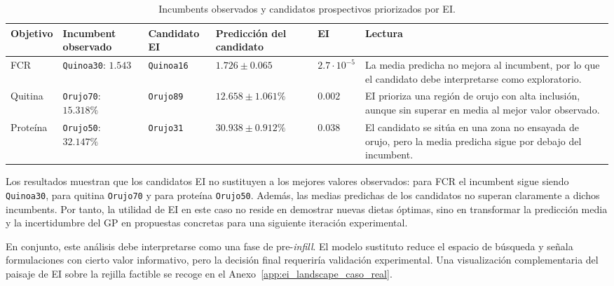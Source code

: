 \begin{table}[htbp]
    \centering
    \small
    \caption[Incumbents y candidatos por EI]{Incumbents observados y candidatos prospectivos priorizados por EI.}
    \label{tab:incumbents_candidatos_ei}
    \renewcommand{\arraystretch}{1.15}
    \setlength{\tabcolsep}{4pt}
    \begin{tabularx}{\textwidth}{@{}p{1.5cm} p{3cm} p{2.6cm} p{2.6cm} p{1.1cm} X@{}}
        \toprule
        \textbf{Objetivo} 
        & \textbf{Incumbent observado} 
        & \textbf{Candidato EI} 
        & \textbf{Predicción del candidato} 
        & \textbf{EI} 
        & \textbf{Lectura} \\
        \midrule

        FCR
        & \texttt{Quinoa30}: \(1.543\)
        & \texttt{Quinoa16}
        & \(1.726 \pm 0.065\)
        & \(2.7{\cdot}10^{-5}\)
        & La media predicha no mejora al incumbent, por lo que el candidato debe interpretarse como exploratorio. \\

        Quitina
        & \texttt{Orujo70}: \(15.318\%\)
        & \texttt{Orujo89}
        & \(12.658 \pm 1.061\%\)
        & \(0.002\)
        & EI prioriza una región de orujo con alta inclusión, aunque sin superar en media al mejor valor observado. \\

        Proteína
        & \texttt{Orujo50}: \(32.147\%\)
        & \texttt{Orujo31}
        & \(30.938 \pm 0.912\%\)
        & \(0.038\)
        & El candidato se sitúa en una zona no ensayada de orujo, pero la media predicha sigue por debajo del incumbent. \\

        \bottomrule
    \end{tabularx}
\end{table}
\FloatBarrier

Los resultados muestran que los candidatos EI no sustituyen a los mejores valores observados: para FCR el incumbent sigue siendo \texttt{Quinoa30}, para quitina \texttt{Orujo70} y para proteína \texttt{Orujo50}. Además, las medias predichas de los candidatos no superan claramente a dichos incumbents. Por tanto, la utilidad de EI en este caso no reside en demostrar nuevas dietas óptimas, sino en transformar la predicción media y la incertidumbre del GP en propuestas concretas para una siguiente iteración experimental.

En conjunto, este análisis debe interpretarse como una fase de pre-\emph{infill}. El modelo sustituto reduce el espacio de búsqueda y señala formulaciones con cierto valor informativo, pero la decisión final requeriría validación experimental. Una visualización complementaria del paisaje de EI sobre la rejilla factible se recoge en el Anexo~\ref{app:ei_landscape_caso_real}.

